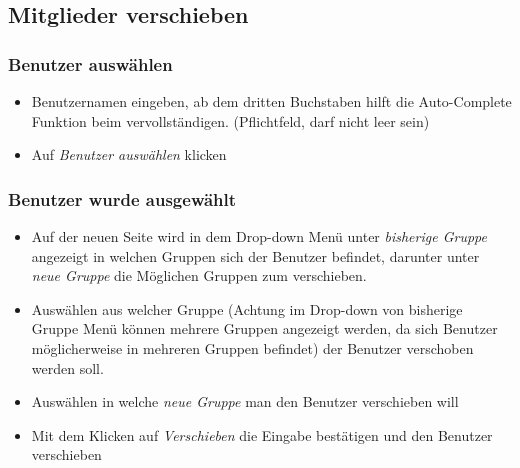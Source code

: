 \newpage
\subsection*{Mitglieder verschieben}
\subsubsection*{Benutzer auswählen}
\begin{itemize}
	\item Benutzernamen eingeben, ab dem dritten Buchstaben hilft die Auto-Complete Funktion beim vervollständigen. (Pflichtfeld, darf nicht leer sein)
	\item Auf \textit{Benutzer auswählen} klicken
\end{itemize}
\subsubsection*{Benutzer wurde ausgewählt}
\begin{itemize}
	\item Auf der neuen Seite wird in dem Drop-down Menü unter \textit{bisherige Gruppe} angezeigt in welchen Gruppen sich der Benutzer befindet, darunter unter \textit{neue Gruppe} die Möglichen Gruppen zum verschieben.
	\item Auswählen aus welcher Gruppe (Achtung im Drop-down von bisherige Gruppe Menü können mehrere Gruppen angezeigt werden, da sich Benutzer möglicherweise in mehreren Gruppen befindet) der Benutzer verschoben werden soll.
	\item Auswählen in welche \textit{neue Gruppe} man den Benutzer verschieben will
	\item Mit dem Klicken auf \textit{Verschieben} die Eingabe bestätigen und den Benutzer verschieben
\end{itemize}


\clearpage